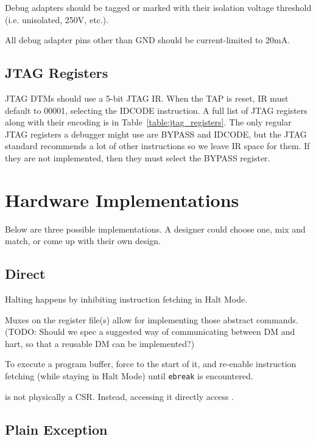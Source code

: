 \documentclass{article}
\begin{document}
Debug adapters should be tagged or marked with their isolation voltage
threshold (i.e. unisolated, 250V, etc.).

All debug adapter pins other than GND should be current-limited to 20mA.

\subsection{JTAG Registers}

JTAG DTMs should use a 5-bit JTAG IR. When the TAP is reset, IR must default to
00001, selecting the IDCODE instruction. A full list of JTAG registers along
with their encoding is in Table~\ref{table:jtag_registers}. The only regular
JTAG registers a debugger might use are BYPASS and IDCODE, but the JTAG
standard recommends a lot of other instructions so we leave IR space for them.
If they are not implemented, then they must select the BYPASS register.



\newpage
\appendix

\section{Hardware Implementations}

Below are three possible implementations. A designer could choose one, mix and
match, or come up with their own design.

\subsection{Direct}

Halting happens by inhibiting instruction fetching in Halt Mode.

Muxes on the register file(s) allow for implementing those abstract commands.
(TODO: Should we spec a suggested way of communicating between DM and hart, so
that a reusable DM can be implemented?)

To execute a program buffer, force \Rpc to the start of it, and re-enable
instruction fetching (while staying in Halt Mode) until {\tt ebreak} is
encountered.

\Rdpc is not physically a CSR. Instead, accessing it directly access \Rpc.

\subsection{Plain Exception}
\end{document}
